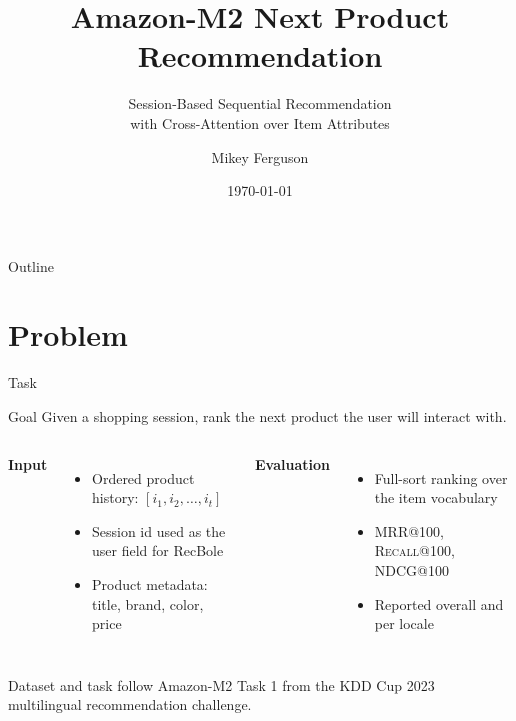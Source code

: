 \documentclass[10pt,aspectratio=169]{beamer}
\title{Amazon-M2 Next Product Recommendation}
\subtitle{Session-Based Sequential Recommendation\\with Cross-Attention over Item Attributes}
\author{Mikey Ferguson}
\institute{The University of Tulsa \\ \textit{Graduate course final project}}
\date{\today}
\newcommand{\metric}[1]{\textsc{#1}}
\begin{document}
\maketitle

\begin{frame}{Outline}
  \tableofcontents
\end{frame}

\section{Problem}

\begin{frame}{Task}
  \begin{block}{Goal}
    Given a shopping session, rank the next product the user will interact with.
  \end{block}

  \vspace{0.4em}
  \begin{columns}[T,onlytextwidth]
      \textbf{Input}
      \begin{itemize}
        \item Ordered product history: \(\left[i_1, i_2, \ldots, i_t\right]\)
        \item Session id used as the user field for RecBole
        \item Product metadata: title, brand, color, price
      \end{itemize}

      \textbf{Evaluation}
      \begin{itemize}
        \item Full-sort ranking over the item vocabulary
        \item \metric{MRR@100}, \metric{Recall@100}, \metric{NDCG@100}
        \item Reported overall and per locale
      \end{itemize}
  \end{columns}

  \vspace{0.6em}
  \footnotesize Dataset and task follow Amazon-M2 Task 1 from the KDD Cup 2023 multilingual recommendation challenge.
\end{frame}
\end{document}
